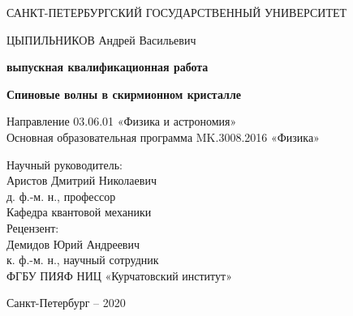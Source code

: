 \begin{titlepage}
\newpage

\begin{center}
САНКТ-ПЕТЕРБУРГСКИЙ ГОСУДАРСТВЕННЫЙ УНИВЕРСИТЕТ\\
\vspace{1cm}

\end{center}


\vspace{0.5cm}
\begin{center}
ЦЫПИЛЬНИКОВ Андрей Васильевич
\end{center}

\vspace{1cm}
\begin{center}
    \textbf{выпускная квалификационная работа}
\end{center}{}
\vspace{1cm}

\begin{center}
\Large{\bf Спиновые волны в скирмионном кристалле}
\end{center}
\vspace{1cm}
\begin{center}
Направление 03.06.01 «Физика и астрономия» \\
Основная образовательная программа MK.3008.2016 «Физика»
\end{center}
\vspace{1cm}


\begin{flushleft}
 Научный руководитель:\\
 Аристов Дмитрий Николаевич\\
 д. ф.-м. н., профессор \\
 Кафедра квантовой механики \\
 Рецензент:\\
 Демидов Юрий Андреевич\\
 к. ф.-м. н., научный сотрудник \\
 ФГБУ ПИЯФ НИЦ «Курчатовский институт» \\
\vspace{1.5em}
\end{flushleft}

\vspace{\fill}

\begin{center}
Санкт-Петербург -- 2020
\end{center}
\end{titlepage}
